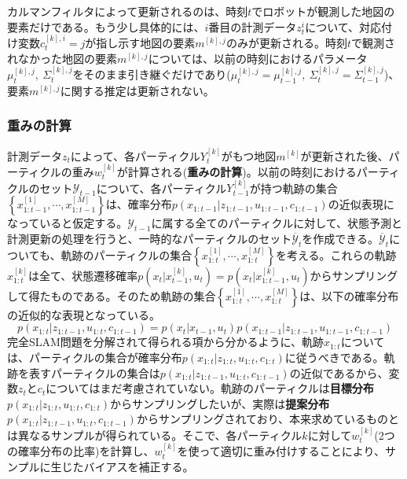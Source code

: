 \documentclass[dvipdfmx,a4paper]{jsarticle}
\begin{document}
カルマンフィルタによって更新されるのは、時刻$t$でロボットが観測した地図の要素だけである。もう少し具体的には、$i$番目の計測データ$z_t^i$について、対応付け変数$c_t^{[k], i} = j$が指し示す地図の要素$m^{[k], j}$のみが更新される。時刻$t$で観測されなかった地図の要素$m^{[k], j}$については、以前の時刻におけるパラメータ$\mu_t^{[k], j}, \ \Sigma_t^{[k], j}$をそのまま引き継ぐだけであり($\mu_t^{[k], j} = \mu_{t - 1}^{[k], j}, \ \Sigma_t^{[k], j} = \Sigma_{t - 1}^{[k], j}$)、要素$m^{[k], j}$に関する推定は更新されない。

\subsubsection{重みの計算}
計測データ$z_t$によって、各パーティクル$Y_t^{[k]}$がもつ地図$m^{[k]}$が更新された後、パーティクルの重み$w_t^{[k]}$が計算される(\textbf{重みの計算})。以前の時刻におけるパーティクルのセット$\mathcal{Y}_{t - 1}$について、各パーティクル$Y_{t - 1}^{[k]}$が持つ軌跡の集合$\left\{ x_{1 : t - 1}^{[1]}, \cdots, x_{1 : t - 1}^{[M]} \right\}$は、確率分布$p(x_{1 : t - 1} | z_{1 : t - 1}, u_{1 : t - 1}, c_{1 : t - 1})$の近似表現になっていると仮定する。$\mathcal{Y}_{t - 1}$に属する全てのパーティクルに対して、状態予測と計測更新の処理を行うと、一時的なパーティクルのセット$\overline{\mathcal{Y}}_t$を作成できる。$\overline{\mathcal{Y}}_t$についても、軌跡のパーティクルの集合$\left\{ x_{1 : t}^{[1]}, \cdots, x_{1 : t}^{[M]} \right\}$を考える。これらの軌跡$x_{1 : t}^{[k]}$は全て、状態遷移確率$p(x_t | x_{t - 1}^{[k]}, u_t) = p(x_t | x_{1 : t - 1}^{[k]}, u_t)$からサンプリングして得たものである。そのため軌跡の集合$\left\{ x_{1 : t}^{[1]}, \cdots, x_{1 : t}^{[M]} \right\}$は、以下の確率分布の近似的な表現となっている。
\begin{equation}
	p(x_{1 : t} | z_{1 : t - 1}, u_{1 : t}, c_{1 : t - 1}) = p(x_t | x_{t - 1}, u_t) p(x_{1 : t - 1} | z_{1 : t - 1}, u_{1 : t - 1}, c_{1 : t - 1})
\end{equation}
完全SLAM問題を分解されて得られる項から分かるように、軌跡$x_{1 : t}$については、パーティクルの集合が確率分布$p(x_{1 : t} | z_{1 : t}, u_{1 : t}, c_{1 : t})$に従うべきである。軌跡を表すパーティクルの集合は$p(x_{1 : t} | z_{1 : t - 1}, u_{1 : t}, c_{1 : t - 1})$の近似であるから、変数$z_t$と$c_t$についてはまだ考慮されていない。軌跡のパーティクルは\textbf{目標分布}$p(x_{1 : t} | z_{1 : t}, u_{1 : t}, c_{1 : t})$からサンプリングしたいが、実際は\textbf{提案分布}$p(x_{1 : t} | z_{1 : t - 1}, u_{1 : t}, c_{1 : t - 1})$からサンプリングされており、本来求めているものとは異なるサンプルが得られている。そこで、各パーティクル$k$に対して$w_t^{[k]}$(2つの確率分布の比率)を計算し、$w_t^{[k]}$を使って適切に重み付けすることにより、サンプルに生じたバイアスを補正する。\newline
\end{document}
